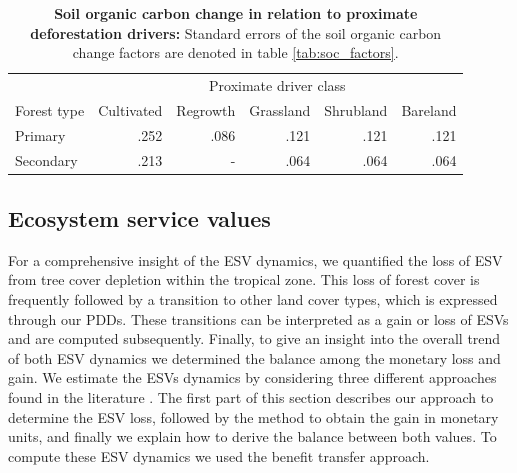 		\begin{table}[ht]
			\centering
			\caption[Soil organic carbon change in relation to proximate deforestation drivers]{\textbf{Soil organic carbon change in relation to proximate deforestation drivers:} Standard errors of the soil organic carbon change factors are denoted in table \ref{tab:soc_factors}.}
			\label{tab:scenario}
			\begin{tabular}{lrrrrr}
				\hline
				& \multicolumn{5}{c}{Proximate driver class} \\\cline{2-6}
				Forest type & Cultivated & Regrowth & Grassland & Shrubland & Bareland \\
				\hline
				Primary & .252 & .086 & .121 & .121 & .121 \\
				Secondary & .213 & - & .064 & .064 & .064 \\
				\hline
			\end{tabular}
		\end{table}

	\subsection{Ecosystem service values}
	\label{subsec:methods_esv}
		For a comprehensive insight of the \ac{ESV} dynamics, we quantified the loss of \ac{ESV} from tree cover depletion within the tropical zone. This loss of forest cover is frequently followed by a transition to other land cover types, which is expressed through our \acp{PDD}. These transitions can be interpreted as a gain or loss of \acp{ESV} and are computed subsequently. Finally, to give an insight into the overall trend of both \ac{ESV} dynamics we determined the balance among the monetary loss and gain. We estimate the \acp{ESV} dynamics by considering three different approaches found in the literature \citep{Costanza2014,Groot2012,Siikamaki2015}. The first part of this section describes our approach to determine the \ac{ESV} loss, followed by the method to obtain the gain in monetary units, and finally we explain how to derive the balance between both values. To compute these \ac{ESV} dynamics we used the benefit transfer approach.

